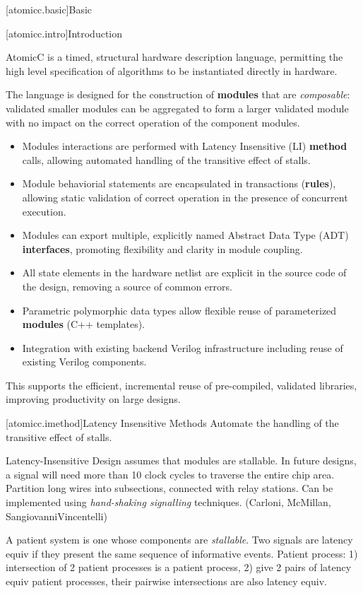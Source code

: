 [atomicc.basic]{Basic}

[atomicc.intro]{Introduction}

AtomicC is a timed, structural hardware description language, permitting
the high level specification of algorithms to be instantiated
directly in hardware.

The language is designed for
the construction of \textbf{modules} that are \textit{composable}:
validated smaller modules can be aggregated to form
a larger validated module with no impact on the correct
operation of the component modules.
\begin{itemize}
\item Modules interactions are performed with Latency Insensitive (LI) \textbf{method} calls, allowing automated handling of the transitive effect of stalls.
\item Module behaviorial statements are encapsulated in transactions (\textbf{rules}), allowing static validation of correct operation in the presence of concurrent execution.
\item Modules can export multiple, explicitly named Abstract Data Type (ADT) \textbf{interfaces},
promoting flexibility and clarity in module coupling.
\item All state elements in the hardware
netlist are explicit in the source code of the design, removing a source of common errors.
\item Parametric polymorphic data types allow flexible reuse of parameterized
\textbf{modules} (C++ templates).
\item Integration with existing backend Verilog infrastructure including reuse of existing Verilog
components.
\end{itemize}
This supports the efficient, incremental reuse of pre-compiled, validated
libraries, improving productivity on large designs.

[atomicc.imethod]{Latency Insensitive Methods}
Automate the handling of the transitive effect of stalls.

Latency-Insensitive Design assumes that modules are stallable.
In future designs, a signal will need more than 10 clock cycles
to traverse the entire chip area.  Partition long wires into
subsections, connected with relay stations.
Can be implemented using \textit{hand-shaking signalling} techniques.
(Carloni, McMillan, SangiovanniVincentelli)

A patient system is one whose components are \textit{stallable}.
Two signals are latency equiv if they present the same sequence of
informative events.
Patient process: 1) intersection of 2 patient processes is a patient
process, 2) give 2 pairs of latency equiv patient processes,
their pairwise intersections are also latency equiv.

